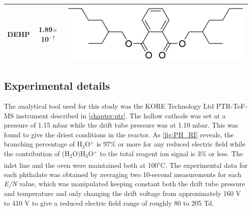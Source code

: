 {\begin{table}
\begin{tabular}{lcc}
DEHP &  1.89$\times$10$^{-7}$   &  \begin{minipage}[c]{0.35\linewidth}\centering
\includegraphics[height=0.07\textheight]{pics/PH/DEHP_struct2.png}\end{minipage}\\ 
\bottomrule
\end{tabular}
\label{tab:PH_structs}
\end{table}

}%



\subsection{Experimental details}

The analytical tool used for this study was the KORE Technology Ltd PTR-ToF-MS instrument described in \autoref{chapter:ptr}.
%
The hollow cathode was set at a pressure of 1.15 mbar while the drift tube pressure was at 1.10 mbar.
%
This was found to give the driest conditions in the reactor.
%
As \autoref{fig:PH_RI} reveals, the branching  percentage of H$_3$O$^+$ is   97\% or more for any reduced electric field while the contribution of  (H$_2$O)H$_3$O$^+$ to the total reagent ion signal is 3\% or less.
%
The inlet line and the oven were maintained both at 100\textsuperscript{$\circ$}C.
%
The experimental data for each phthalate was obtained by averaging two 10-second measurements for each \textit{E/N} value, which was manipulated keeping constant both  the drift tube pressure and  temperature and only changing the drift voltage  from approximately 160 V to 410 V to give a reduced electric field range of roughly 80 to 205 Td.



